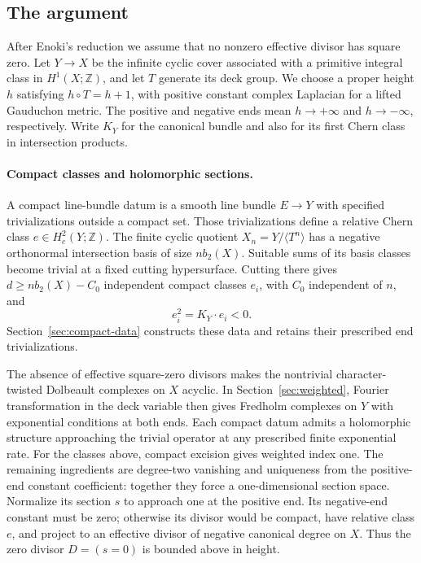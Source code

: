 \documentclass[11pt]{article}
\numberwithin{equation}{section}
\theoremstyle{definition}
\theoremstyle{remark}
\newcommand{\ZZ}{\mathbb Z}
\begin{document}
\subsection*{The argument}

After Enoki's reduction we assume that no nonzero effective divisor
has square zero. Let $Y\to X$ be the infinite cyclic cover associated
with a primitive integral class in $H^1(X;\ZZ)$, and let $T$ generate
its deck group. We choose a proper height $h$ satisfying
$h\circ T=h+1$, with positive constant complex Laplacian for a lifted
Gauduchon metric. The positive and negative ends mean $h\to+\infty$
and $h\to-\infty$, respectively. Write $K_Y$ for the canonical bundle
and also for its first Chern class in intersection products.

\paragraph{Compact classes and holomorphic sections.}
A compact line-bundle datum is a smooth line bundle $E\to Y$ with
specified trivializations outside a compact set. Those trivializations
define a relative Chern class $e\in H_c^2(Y;\ZZ)$. The finite cyclic
quotient $X_n=Y/\langle T^n\rangle$ has a negative orthonormal
intersection basis of size $n b_2(X)$. Suitable sums of its basis
classes become trivial at a fixed cutting hypersurface. Cutting there
gives $d\ge n b_2(X)-C_0$ independent compact classes $e_i$, with
$C_0$ independent of $n$, and
\[
 e_i^2=K_Y\cdot e_i<0.
\]
Section~\ref{sec:compact-data} constructs these data and retains their
prescribed end trivializations.

The absence of effective square-zero divisors makes the nontrivial
character-twisted Dolbeault complexes on $X$ acyclic. In
Section~\ref{sec:weighted}, Fourier transformation in the deck variable
then gives Fredholm complexes on $Y$ with exponential conditions at
both ends. Each compact datum admits a holomorphic structure
approaching the trivial operator at any prescribed finite exponential
rate. For the classes above, compact excision gives weighted index one.
The remaining ingredients are degree-two vanishing and uniqueness from
the positive-end constant coefficient: together they force a
one-dimensional section space. Normalize its section $s$ to approach
one at the positive end. Its negative-end constant must be zero;
otherwise its divisor would be compact, have relative class $e$, and
project to an effective divisor of negative canonical degree on $X$.
Thus the zero divisor $D=(s=0)$ is bounded above in height.
\end{document}
